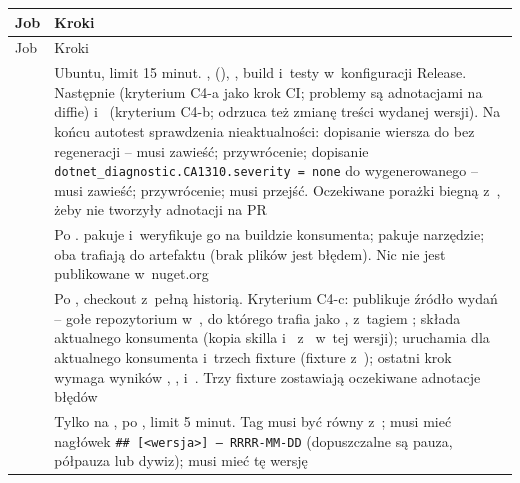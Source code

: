\begin{xltabular}{\linewidth}{@{}>{\raggedright\arraybackslash}p{2.9cm} >{\raggedright\arraybackslash}X@{}}
\toprule
Job & Kroki \\
\midrule
\endfirsthead
\toprule
Job & Kroki \\
\midrule
\endhead
{} & Ubuntu, limit 15 minut. ,  (), , build i~testy w~konfiguracji Release. Następnie  (kryterium C4-a jako krok CI; problemy są adnotacjami na diffie) i~ (kryterium C4-b; odrzuca też zmianę treści wydanej wersji). Na końcu autotest sprawdzenia nieaktualności: dopisanie wiersza do  bez regeneracji --  musi zawieść; przywrócenie; dopisanie \texttt{dotnet\_diagnostic.CA1310.severity = none} do wygenerowanego  --  musi zawieść; przywrócenie;  musi przejść. Oczekiwane porażki biegną z~, żeby nie tworzyły adnotacji na PR \\
 & Po .  pakuje  i~weryfikuje go na buildzie konsumenta;  pakuje narzędzie; oba  trafiają do artefaktu  (brak plików jest błędem). Nic nie jest publikowane w~nuget.org \\
 & Po , checkout z~pełną historią. Kryterium C4-c: publikuje źródło wydań -- gołe repozytorium w~, do którego trafia  jako , z~tagiem ; składa aktualnego konsumenta (kopia skilla i~ z~ w~tej wersji); uruchamia  dla aktualnego konsumenta i~trzech fixture (fixture z~); ostatni krok wymaga wyników , ,  i~. Trzy fixture zostawiają oczekiwane adnotacje błędów \\
 & Tylko na , po , limit 5 minut. Tag musi być równy  z~;  musi mieć nagłówek \texttt{\#\# [<wersja>] — RRRR-MM-DD} (dopuszczalne są pauza, półpauza lub dywiz);  musi mieć tę wersję \\
\bottomrule
\end{xltabular}

